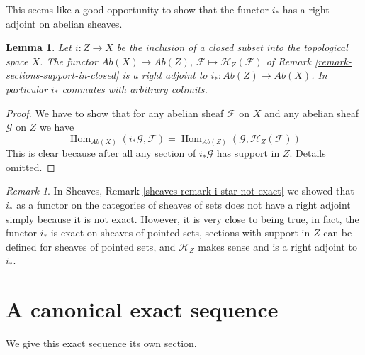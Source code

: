 \documentclass{stacks-project}
\theoremstyle{plain}
\newtheorem{lemma}[subsection]{Lemma}
\theoremstyle{definition}
\theoremstyle{remark}
\newtheorem{remark}[subsection]{Remark}
\numberwithin{equation}{subsection}
\def\Hom{\mathop{\mathrm{Hom}}\nolimits}
\begin{document}
\noindent
This seems like a good opportunity to show that the functor
$i_*$ has a right adjoint on abelian sheaves.

\begin{lemma}
\label{lemma-i-star-right-adjoint}
Let $i : Z \to X$ be the inclusion of a closed subset into the
topological space $X$. The functor $\textit{Ab}(X) \to \textit{Ab}(Z)$,
$\mathcal{F} \mapsto \mathcal{H}_Z(\mathcal{F})$ of
Remark \ref{remark-sections-support-in-closed}
is a right adjoint to $i_* : \textit{Ab}(Z) \to \textit{Ab}(X)$.
In particular $i_*$ commutes with arbitrary colimits.
\end{lemma}

\begin{proof}
We have to show that for any abelian sheaf $\mathcal{F}$ on $X$ and any
abelian sheaf $\mathcal{G}$ on $Z$ we have
$$
\Hom_{\textit{Ab}(X)}(i_*\mathcal{G}, \mathcal{F}) =
\Hom_{\textit{Ab}(Z)}(\mathcal{G}, \mathcal{H}_Z(\mathcal{F}))
$$
This is clear because after all any section of $i_*\mathcal{G}$
has support in $Z$. Details omitted.
\end{proof}

\begin{remark}
\label{remark-i-star-right-adjoint}
In Sheaves, Remark \ref{sheaves-remark-i-star-not-exact}
we showed that $i_*$ as a functor
on the categories of sheaves of sets
does not have a right adjoint simply because
it is not exact. However, it is very close to being
true, in fact, the functor $i_*$ is exact on sheaves
of pointed sets, sections with support in $Z$ can
be defined for sheaves of pointed sets, and $\mathcal{H}_Z$
makes sense and is a right adjoint to $i_*$.
\end{remark}









\section{A canonical exact sequence}
\label{section-canonical-exact-sequence}

\noindent
We give this exact sequence its own section.
\end{document}
